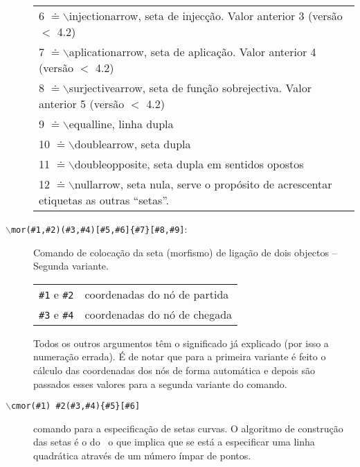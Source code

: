 \documentclass[a4paper,11pt]{article}
\begin{document}
\begin{description}
\begin{longtable}{r@{ -- }p{32em}}
    \multicolumn{2}{l}{\hspace*{4.5em} 6 $\doteq\backslash$injectionarrow, seta de
      injecção. Valor anterior 3 (vers\~ao $<$ 4.2) } \\
    \multicolumn{2}{l}{\hspace*{4.5em} 7 $\doteq\backslash$aplicationarrow, seta de
      aplicação. Valor anterior 4 (vers\~ao $<$ 4.2) } \\ 
    \multicolumn{2}{l}{\hspace*{4.5em} 8 $\doteq\backslash$surjectivearrow, seta de
      função sobrejectiva. Valor anterior 5 (vers\~ao $<$ 4.2) }\\ 
    \multicolumn{2}{l}{\hspace*{4.5em} 9 $\doteq\backslash$equalline, linha dupla}\\ 
    \multicolumn{2}{l}{\hspace*{4.5em} 10
      $\doteq\backslash$doublearrow, seta dupla}\\ 
    \multicolumn{2}{l}{\hspace*{4.5em} 11
      $\doteq\backslash$doubleopposite, seta dupla em sentidos opostos}\\ 
    \multicolumn{2}{l}{\hspace*{4.5em} 12
      $\doteq\backslash$nullarrow, seta nula, serve o propósito de
      acrescentar etiquetas as outras ``setas''.}\\ 
    \end{longtable}

\item[{\tt $\backslash$mor(\#1,\#2)(\#3,\#4)[\#5,\#6]\{\#7\}[\#8,\#9]}:]
  Comando de colocação da seta (morfismo) de ligação de dois objectos
  -- Segunda variante.

  \begin{longtable}{r@{ -- }p{32em}}
    {\tt \#1} e  {\tt \#2} & coordenadas do nó de partida\\
    {\tt \#3} e  {\tt \#4} & coordenadas do nó de chegada\\
  \end{longtable}

  Todos os outros argumentos têm o significado já explicado (por
  isso a numeração errada). É de notar que para a primeira variante é
  feito o cálculo das coordenadas dos nós de forma automática e depois
  são passados esses valores para a segunda variante do comando.


\item[{\tt $\backslash$cmor(\#1) \#2(\#3,\#4)\{\#5\}[\#6]}] comando para a
  especificação de setas curvas. O algoritmo de construção das setas é
  o do \PiCTeX\ o que implica que se está a especificar uma linha
  quadrática através de um número ímpar de pontos. 


\end{description}
\end{document}
